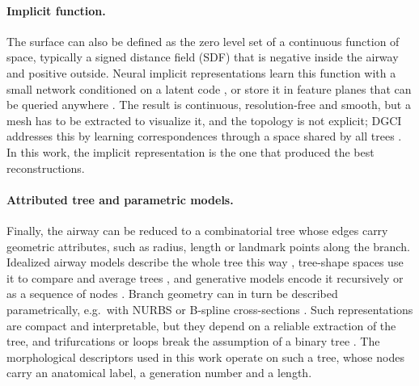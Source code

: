 \paragraph{Implicit function.}           %
The surface can also be defined as the zero level set of a continuous function of space,
typically a signed distance field (SDF) that is negative inside the airway and positive
outside. Neural implicit representations learn this function with a small network conditioned
on a latent code \cite{park2019,sitzmann2020}, or store it in feature planes that can be queried
anywhere \cite{weng2026topofield}. The result is continuous, resolution-free and smooth, but a
mesh has to be extracted to visualize it, and the topology is not explicit; DGCI addresses this
by learning correspondences through a space shared by all trees \cite{zhang2024}. In this work,
the implicit representation is the one that produced the best reconstructions.

\paragraph{Attributed tree and parametric models.}  %
Finally, the airway can be reduced to a combinatorial tree whose edges carry geometric
attributes, such as radius, length or landmark points along the branch. Idealized airway
models describe the whole tree this way \cite{horsfield1971models,kitaoka1999}, tree-shape
spaces use it to compare and average trees \cite{feragen2011means,feragen2011airway}, and
generative models encode it recursively \cite{feldman2023vesselvae,batten2025vetta} or as a
sequence of nodes \cite{feldman2025vesselgpt}. Branch geometry can in turn be described
parametrically, e.g.\ with NURBS \cite{ortizpuerta2022} or B-spline cross-sections
\cite{feldman2025vesselgpt}. Such representations are compact and interpretable, but they
depend on a reliable extraction of the tree, and trifurcations or loops break the assumption of
a binary tree \cite{miyawaki2017automatic}. The morphological descriptors used in this work
operate on such a tree, whose nodes carry an anatomical label, a generation number and a length.

